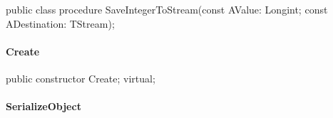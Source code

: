 \documentclass{report}
\newif\ifpdf
\begin{document}
\label{PasDoc_Serialize.TSerializable-SaveIntegerToStream}
\begin{list}{}{
\setlength{\itemindent}{0cm}
\setlength{\listparindent}{0cm}
\setlength{\leftmargin}{\evensidemargin}
\addtolength{\leftmargin}{\tmplength}
\settowidth{\labelsep}{X}
\addtolength{\leftmargin}{\labelsep}
\setlength{\labelwidth}{\tmplength}
}
\item[\textbf{Declaration}\hfill]
\ifpdf
\begin{flushleft}
\fi
\begin{ttfamily}
public class procedure SaveIntegerToStream(const AValue: Longint; const ADestination: TStream);\end{ttfamily}

\ifpdf
\end{flushleft}
\fi

\end{list}
\paragraph*{Create}\hspace*{\fill}

\label{PasDoc_Serialize.TSerializable-Create}
\begin{list}{}{
\setlength{\itemindent}{0cm}
\setlength{\listparindent}{0cm}
\setlength{\leftmargin}{\evensidemargin}
\addtolength{\leftmargin}{\tmplength}
\settowidth{\labelsep}{X}
\addtolength{\leftmargin}{\labelsep}
\setlength{\labelwidth}{\tmplength}
}
\item[\textbf{Declaration}\hfill]
\ifpdf
\begin{flushleft}
\fi
\begin{ttfamily}
public constructor Create; virtual;\end{ttfamily}

\ifpdf
\end{flushleft}
\fi

\end{list}
\paragraph*{SerializeObject}\hspace*{\fill}
\end{document}
